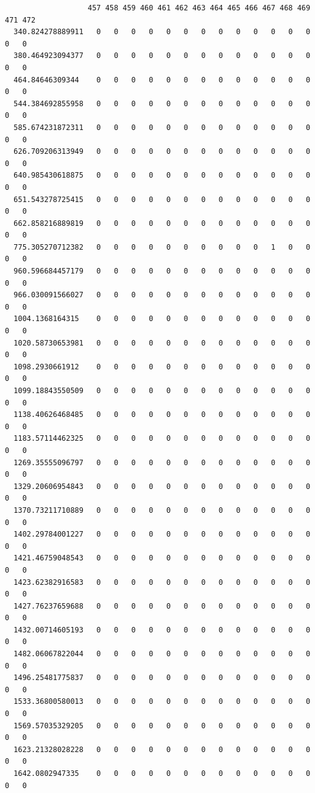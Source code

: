\documentclass[
  letterpaper,
  DIV=11,
  numbers=noendperiod]{scrartcl}
\begin{document}
\begin{verbatim}
                   457 458 459 460 461 462 463 464 465 466 467 468 469 471 472
  340.824278889911   0   0   0   0   0   0   0   0   0   0   0   0   0   0   0
  380.464923094377   0   0   0   0   0   0   0   0   0   0   0   0   0   0   0
  464.84646309344    0   0   0   0   0   0   0   0   0   0   0   0   0   0   0
  544.384692855958   0   0   0   0   0   0   0   0   0   0   0   0   0   0   0
  585.674231872311   0   0   0   0   0   0   0   0   0   0   0   0   0   0   0
  626.709206313949   0   0   0   0   0   0   0   0   0   0   0   0   0   0   0
  640.985430618875   0   0   0   0   0   0   0   0   0   0   0   0   0   0   0
  651.543278725415   0   0   0   0   0   0   0   0   0   0   0   0   0   0   0
  662.858216889819   0   0   0   0   0   0   0   0   0   0   0   0   0   0   0
  775.305270712382   0   0   0   0   0   0   0   0   0   0   1   0   0   0   0
  960.596684457179   0   0   0   0   0   0   0   0   0   0   0   0   0   0   0
  966.030091566027   0   0   0   0   0   0   0   0   0   0   0   0   0   0   0
  1004.1368164315    0   0   0   0   0   0   0   0   0   0   0   0   0   0   0
  1020.58730653981   0   0   0   0   0   0   0   0   0   0   0   0   0   0   0
  1098.2930661912    0   0   0   0   0   0   0   0   0   0   0   0   0   0   0
  1099.18843550509   0   0   0   0   0   0   0   0   0   0   0   0   0   0   0
  1138.40626468485   0   0   0   0   0   0   0   0   0   0   0   0   0   0   0
  1183.57114462325   0   0   0   0   0   0   0   0   0   0   0   0   0   0   0
  1269.35555096797   0   0   0   0   0   0   0   0   0   0   0   0   0   0   0
  1329.20606954843   0   0   0   0   0   0   0   0   0   0   0   0   0   0   0
  1370.73211710889   0   0   0   0   0   0   0   0   0   0   0   0   0   0   0
  1402.29784001227   0   0   0   0   0   0   0   0   0   0   0   0   0   0   0
  1421.46759048543   0   0   0   0   0   0   0   0   0   0   0   0   0   0   0
  1423.62382916583   0   0   0   0   0   0   0   0   0   0   0   0   0   0   0
  1427.76237659688   0   0   0   0   0   0   0   0   0   0   0   0   0   0   0
  1432.00714605193   0   0   0   0   0   0   0   0   0   0   0   0   0   0   0
  1482.06067822044   0   0   0   0   0   0   0   0   0   0   0   0   0   0   0
  1496.25481775837   0   0   0   0   0   0   0   0   0   0   0   0   0   0   0
  1533.36800580013   0   0   0   0   0   0   0   0   0   0   0   0   0   0   0
  1569.57035329205   0   0   0   0   0   0   0   0   0   0   0   0   0   0   0
  1623.21328028228   0   0   0   0   0   0   0   0   0   0   0   0   0   0   0
  1642.0802947335    0   0   0   0   0   0   0   0   0   0   0   0   0   0   0

\end{verbatim}
\end{document}
